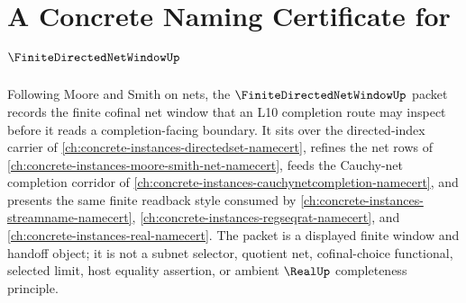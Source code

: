 \chapter{A Concrete Naming Certificate for $\FiniteDirectedNetWindowUp$}
\label{ch:concrete-instances-finite-directed-net-window-namecert}

Following Moore and Smith on nets, the $\FiniteDirectedNetWindowUp$ packet records the finite cofinal net window that an L10 completion route may inspect before it reads a completion-facing boundary. It sits over the directed-index carrier of \autoref{ch:concrete-instances-directedset-namecert}, refines the net rows of \autoref{ch:concrete-instances-moore-smith-net-namecert}, feeds the Cauchy-net completion corridor of \autoref{ch:concrete-instances-cauchynetcompletion-namecert}, and presents the same finite readback style consumed by \autoref{ch:concrete-instances-streamname-namecert}, \autoref{ch:concrete-instances-regseqrat-namecert}, and \autoref{ch:concrete-instances-real-namecert}. The packet is a displayed finite window and handoff object; it is not a subnet selector, quotient net, cofinal-choice functional, selected limit, host equality assertion, or ambient $\RealUp$ completeness principle.

